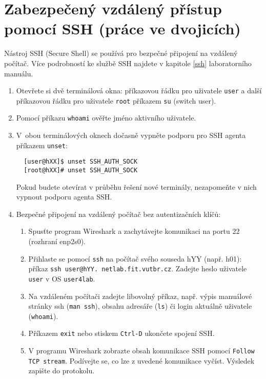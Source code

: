 \documentclass[a4paper,11pt]{article}
\begin{document}
\section{Zabezpečený vzdálený přístup pomocí SSH (práce ve dvojicích)}
Nástroj SSH (Secure Shell) se používá pro bezpečné připojení na vzdálený počítač. Více podrobností ke službě SSH najdete v kapitole \ref{ssh} laboratorního manuálu.
\begin{enumerate}
  \item Otevřete si dvě terminálová okna: příkazovou řádku pro uživatele {\tt user} a další
    příkazovou řádku pro uživatele {\tt root} příkazem {\tt su} (switch user).
  \item Pomocí příkazu {\tt whoami} ověřte jméno aktivního uživatele. 
  \item V~obou terminálových oknech dočasně vypněte podporu pro SSH agenta příkazem {\tt unset}:
  \begin{lstlisting}
  [user@hXX]$ unset SSH_AUTH_SOCK
  [root@hXX]# unset SSH_AUTH_SOCK
  \end{lstlisting}

  Pokud budete otevírat v průběhu řešení nové terminály, nezapomeňte v nich vypnout podporu agenta SSH.

  \item Bezpečné připojení na vzdálený počítač bez autentizačních klíčů:
    \begin{enumerate}
      \item Spusťte program Wireshark a zachytávejte komunikaci na portu 22 (rozhraní enp2s0).
      \item Přihlaste se pomocí {\tt ssh} na počítač svého souseda hYY (např. h01): příkaz
        {\tt ssh user@hYY. netlab.fit.vutbr.cz}. Zadejte heslo uživatele {\tt user} v OS {\tt user4lab}.
      \item Na vzdáleném počítači zadejte libovolný příkaz, např. výpis manuálové stránky ssh ({\tt man ssh}), obsahu adresáře ({\tt ls}) či login aktuálně uživatele ({\tt whoami}).
      \item Příkazem {\tt exit} nebo stiskem {\tt Ctrl-D} ukončete spojení SSH.
      \item V programu Wireshark zobrazte obsah komunikace SSH pomocí {\tt Follow TCP stream}.
        Podívejte se, co lze z uvedené komunikace vyčíst. Výsledek zapište do protokolu.
    \end{enumerate}


\end{enumerate}
\end{document}
